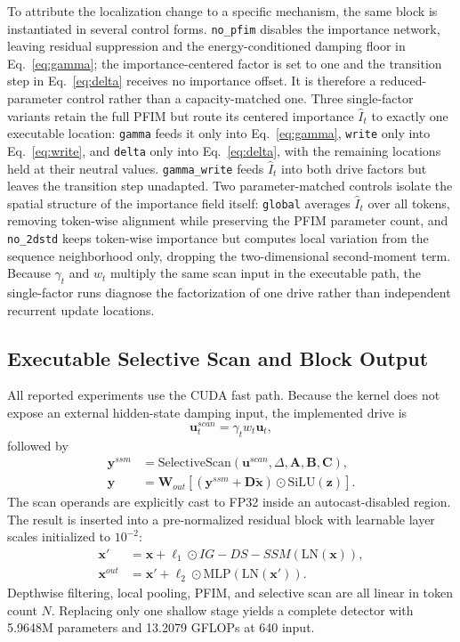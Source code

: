 \documentclass[letterpaper]{article}
\newcommand{\method}{IG-DS-SSM}
\begin{document}
To attribute the localization change to a specific mechanism, the same block is instantiated in several control forms. \texttt{no\_pfim} disables the importance network, leaving residual suppression and the energy-conditioned damping floor in Eq.~\ref{eq:gamma}; the importance-centered factor is set to one and the transition step in Eq.~\ref{eq:delta} receives no importance offset. It is therefore a reduced-parameter control rather than a capacity-matched one. Three single-factor variants retain the full PFIM but route its centered importance $\widehat I_t$ to exactly one executable location: \texttt{gamma} feeds it only into Eq.~\ref{eq:gamma}, \texttt{write} only into Eq.~\ref{eq:write}, and \texttt{delta} only into Eq.~\ref{eq:delta}, with the remaining locations held at their neutral values. \texttt{gamma\_write} feeds $\widehat I_t$ into both drive factors but leaves the transition step unadapted. Two parameter-matched controls isolate the spatial structure of the importance field itself: \texttt{global} averages $\widehat I_t$ over all tokens, removing token-wise alignment while preserving the PFIM parameter count, and \texttt{no\_2dstd} keeps token-wise importance but computes local variation from the sequence neighborhood only, dropping the two-dimensional second-moment term. Because $\gamma_t$ and $w_t$ multiply the same scan input in the executable path, the single-factor runs diagnose the factorization of one drive rather than independent recurrent update locations.

\subsection{Executable Selective Scan and Block Output}

All reported experiments use the CUDA fast path. Because the kernel does not expose an external hidden-state damping input, the implemented drive is
\begin{equation}
  \mathbf{u}^{scan}_t=\gamma_t w_t\mathbf{u}_t,
  \label{eq:scaninput}
\end{equation}
followed by
\begin{align}
  \mathbf{y}^{ssm}&=\mathrm{SelectiveScan}(\mathbf{u}^{scan},\Delta,\mathbf{A},\mathbf{B},\mathbf{C}),\\
  \mathbf{y}&=\mathbf{W}_{out}\!\left[(\mathbf{y}^{ssm}+\mathbf{D}\widetilde{\mathbf{x}})
  \odot\mathrm{SiLU}(\mathbf{z})\right].
  \label{eq:output}
\end{align}
The scan operands are explicitly cast to FP32 inside an autocast-disabled region. The result is inserted into a pre-normalized residual block with learnable layer scales initialized to $10^{-2}$:
\begin{align}
  \mathbf{x}'&=\mathbf{x}+\ell_1\odot\method(\mathrm{LN}(\mathbf{x})),\\
  \mathbf{x}^{out}&=\mathbf{x}'+\ell_2\odot\mathrm{MLP}(\mathrm{LN}(\mathbf{x}')).
\end{align}
Depthwise filtering, local pooling, PFIM, and selective scan are all linear in token count $N$. Replacing only one shallow stage yields a complete detector with 5.9648M parameters and 13.2079 GFLOPs at 640 input.
\end{document}
